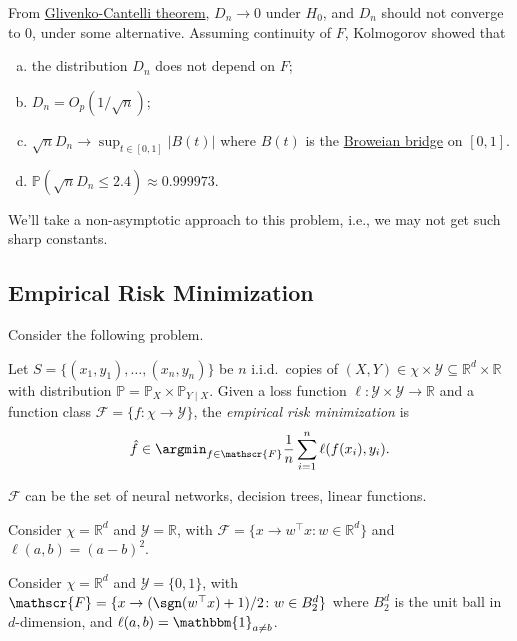 From \href{https://en.wikipedia.org/wiki/Glivenko-Cantelli_theorem}{Glivenko-Cantelli theorem}, \(D_n \to 0\) under \(H_0\), and \(D_n\) should not converge to \(0\), under some alternative. Assuming continuity of \(F\), Kolmogorov showed that
\begin{enumerate}[(a)]
	\item the distribution \(D_n\) does not depend on \(F\);
	\item \(D_n = O_p(1 / \sqrt{n} )\);
	\item \(\sqrt{n} D_n \to \sup _{t\in [0, 1]} \vert B(t) \vert \) where \(B(t)\) is the \href{https://en.wikipedia.org/wiki/Brownian_bridge}{Broweian bridge} on \([0, 1]\).
	\item \(\mathbb{P} (\sqrt{n}D_n  \leq 2.4) \approx 0.999973\).
\end{enumerate}
We'll take a non-asymptotic approach to this problem, i.e., we may not get such sharp constants.

\subsection{Empirical Risk Minimization}
Consider the following problem.

\begin{problem}\label{prb:ERM}
Let \(S = \{ (x_1, y_1) , \dots , (x_n, y_n)\} \) be \(n\) i.i.d.\ copies of \((X, Y) \in \chi \times \mathscr{Y} \subseteq \mathbb{R} ^d\times \mathbb{R}\) with distribution \(\mathbb{P} = \mathbb{P} _X \times \mathbb{P} _{Y \mid X}\). Given a loss function \(\ell \colon \mathscr{Y} \times \mathscr{Y} \to \mathbb{R}\) and a function class \(\mathscr{F} = \{ f\colon \chi \to \mathscr{Y}  \} \), the \emph{empirical risk minimization} is
\[
	\hat{f} \in \argmin_{f\in \mathscr{F} } \frac{1}{n}\sum_{i=1}^{n} \ell (f(x_i), y_i).
\]
\end{problem}

\begin{eg}
	\(\mathscr{F} \) can be the set of neural networks, decision trees, linear functions.
\end{eg}

\begin{eg}
	Consider \(\chi = \mathbb{R} ^d\) and \(\mathscr{Y} = \mathbb{R} \), with \(\mathscr{F} = \{ x \to w^{\top} x \colon w\in \mathbb{R} ^d \} \) and \(\ell (a, b) = (a - b)^2\).
\end{eg}

\begin{eg}
	Consider \(\chi = \mathbb{R} ^d\) and \(\mathscr{Y} = \{ 0, 1 \} \), with \(\mathscr{F} = \{ x \to (\sgn (w^{\top} x ) + 1)/ 2 \colon w\in B_2^d \}\) where \(B_2^d\) is the unit ball in \(d\)-dimension, and \(\ell (a, b) = \mathbbm{1}_{a \neq b} \).
\end{eg}

